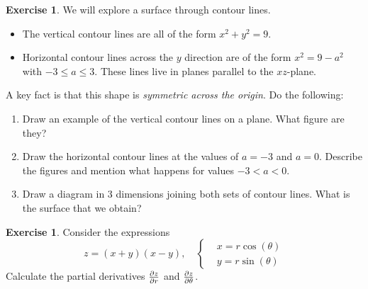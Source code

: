\documentclass[12pt]{article}
\theoremstyle{plain}
\theoremstyle{definition}
\newtheorem{Ej}[Th]{Exercise}         %
\theoremstyle{remark}
\newcommand{\te}{\theta}                %
\renewcommand{\leq}{\leqslant}      %
\renewcommand{\:}{\colon}           %
\newcommand{\un}[1]{\underline{#1}}
\renewcommand{\.}{\Cdot}                %
\begin{document}

  \begin{Ej}
    We will explore a surface through contour lines. 
    \begin{itemize}
      \item The vertical contour lines are all of the form \un{$x^2+y^2=9$}.
      \item Horizontal contour lines across the $y$ direction are of the form \un{$x^2=9-a^2$} with $-3\leq a\leq 3$.
      These lines live in planes parallel to the $xz$-plane.
    \end{itemize}
    A key fact is that this shape is \textit{symmetric across the origin}. Do the following:
    \begin{enumerate}
      \item Draw an example of the vertical contour lines on a plane. What figure are they?
      \item Draw the horizontal contour lines at the values of $a=-3$ and $a=0$. Describe the figures and mention what happens for values $-3<a<0$.
      \item Draw a diagram in 3 dimensions joining both sets of contour lines. What is the surface that we obtain?
    \end{enumerate}
    \end{Ej}

    \begin{ptcb}
     \vspace{17cm}
    \end{ptcb}
\newpage
    \begin{Ej}
      Consider the expressions 
      $$z=(x+y)(x-y),\quad \left\lbrace
      \begin{aligned}
        &x=r\cos(\te)\\
        &y=r\sin(\te)
      \end{aligned}
      \right.$$
      Calculate the partial derivatives $\pdv{z}{r}$ and $\pdv{z}{\te}$.
    \end{Ej}
    \begin{ptcb}
      \vspace{21cm}
    \end{ptcb}
\end{document}
